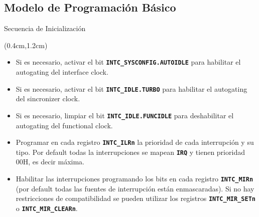 \documentclass[usenames,table,xcolor={x11names},aspectratio=169]{beamer}
\begin{document}
\subsection{Modelo de Programación Básico}
\begin{frame}[t]{Secuencia de Inicialización}
 \begin{textblock*}{\textwidth}(0.4cm,1.2cm)
  \begin{itemize}[<+(1)->]\justifying \parskip 0.18cm
   \item Si es necesario, activar el bit \textbf{\texttt{INTC\_SYSCONFIG.AUTOIDLE}} para habilitar el autogating del interface clock.
   \item Si es necesario, activar el bit \textbf{\texttt{INTC\_IDLE.TURBO}} para habilitar el autogating del sincronizer clock.
   \item Si es necesario, limpiar el bit \textbf{\texttt{INTC\_IDLE.FUNCIDLE}} para deshabilitar el autogating del functional clock.
   \item Programar en cada registro \textbf{\texttt{INTC\_ILRn}} la prioridad de cada interrupción y su tipo. Por default todas la interrupciones se mapean \textbf{\texttt{IRQ}} y tienen prioridad 00H, es decir máxima.
   \item Habilitar las interrupciones programando los bits en cada registro \textbf{\texttt{INTC\_MIRn}} (por default todas las fuentes de interrupción están enmascaradas). Si no hay restricciones de compatibilidad se pueden utilizar los registros \textbf{\texttt{INTC\_MIR\_SETn}} o \textbf{\texttt{INTC\_MIR\_CLEARn}}.
  \end{itemize}
 \end{textblock*}
\end{frame}
\end{document}
